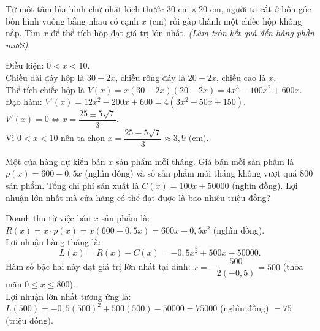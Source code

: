 \begin{ex}
Từ một tấm bìa hình chữ nhật kích thước $30\text{ cm} \times 20\text{ cm}$, người ta cắt ở bốn góc bốn hình vuông bằng nhau có cạnh $x\text{ (cm)}$ rồi gấp thành một chiếc hộp không nắp. Tìm $x$ để thể tích hộp đạt giá trị lớn nhất. \textit{(Làm tròn kết quả đến hàng phần mười)}.
\begin{center}
\end{center}
\begin{loigiai}
Điều kiện: $0 < x < 10$.\\
Chiều dài đáy hộp là $30 - 2x$, chiều rộng đáy là $20 - 2x$, chiều cao là $x$.\\
Thể tích chiếc hộp là $V(x) = x(30 - 2x)(20 - 2x) = 4x^3 - 100x^2 + 600x$.\\
Đạo hàm: $V'(x) = 12x^2 - 200x + 600 = 4(3x^2 - 50x + 150)$.\\
$V'(x) = 0 \Leftrightarrow x = \dfrac{25 \pm 5\sqrt{7}}{3}$.\\
Vì $0 < x < 10$ nên ta chọn $x = \dfrac{25 - 5\sqrt{7}}{3} \approx 3{,}9\text{ (cm)}$.
\end{loigiai}
\end{ex}

\begin{ex}
Một cửa hàng dự kiến bán $x$ sản phẩm mỗi tháng. Giá bán mỗi sản phẩm là $p(x) = 600 - 0{,}5x$ (nghìn đồng) và số sản phẩm mỗi tháng không vượt quá $800$ sản phẩm. Tổng chi phí sản xuất là $C(x) = 100x + 50000$ (nghìn đồng). Lợi nhuận lớn nhất mà cửa hàng có thể đạt được là bao nhiêu triệu đồng?
\begin{loigiai}
Doanh thu từ việc bán $x$ sản phẩm là:
$R(x) = x \cdot p(x) = x(600 - 0{,}5x) = 600x - 0{,}5x^2$ (nghìn đồng).\\
Lợi nhuận hàng tháng là:
\[ L(x) = R(x) - C(x) = -0{,}5x^2 + 500x - 50000. \]
Hàm số bậc hai này đạt giá trị lớn nhất tại đỉnh:
$x = -\dfrac{500}{2(-0{,}5)} = 500$ (thỏa mãn $0 \le x \le 800$).\\
Lợi nhuận lớn nhất tương ứng là:
$L(500) = -0{,}5(500)^2 + 500(500) - 50000 = 75000$ (nghìn đồng) $= 75$ (triệu đồng).
\end{loigiai}
\end{ex}

